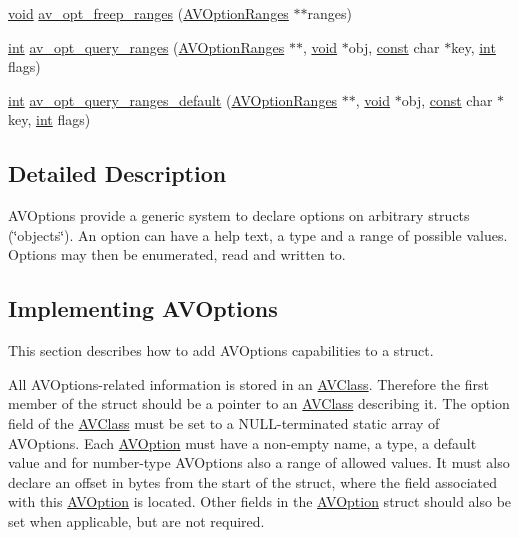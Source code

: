 \begin{DoxyCompactItemize}
\item 
\hyperlink{sound_8c_ae35f5844602719cf66324f4de2a658b3}{void} \hyperlink{group__avoptions_ga880756f24644ff66c806ed2d9ab3d790}{av\+\_\+opt\+\_\+freep\+\_\+ranges} (\hyperlink{struct_a_v_option_ranges}{A\+V\+Option\+Ranges} $\ast$$\ast$ranges)
\item 
\hyperlink{xmltok_8h_a5a0d4a5641ce434f1d23533f2b2e6653}{int} \hyperlink{group__avoptions_ga9751db4da3e0facd522f5b345f4001ef}{av\+\_\+opt\+\_\+query\+\_\+ranges} (\hyperlink{struct_a_v_option_ranges}{A\+V\+Option\+Ranges} $\ast$$\ast$, \hyperlink{sound_8c_ae35f5844602719cf66324f4de2a658b3}{void} $\ast$obj, \hyperlink{getopt1_8c_a2c212835823e3c54a8ab6d95c652660e}{const} char $\ast$key, \hyperlink{xmltok_8h_a5a0d4a5641ce434f1d23533f2b2e6653}{int} flags)
\item 
\hyperlink{xmltok_8h_a5a0d4a5641ce434f1d23533f2b2e6653}{int} \hyperlink{group__avoptions_ga4e50bee09b6a374cc54237314892c001}{av\+\_\+opt\+\_\+query\+\_\+ranges\+\_\+default} (\hyperlink{struct_a_v_option_ranges}{A\+V\+Option\+Ranges} $\ast$$\ast$, \hyperlink{sound_8c_ae35f5844602719cf66324f4de2a658b3}{void} $\ast$obj, \hyperlink{getopt1_8c_a2c212835823e3c54a8ab6d95c652660e}{const} char $\ast$key, \hyperlink{xmltok_8h_a5a0d4a5641ce434f1d23533f2b2e6653}{int} flags)
\end{DoxyCompactItemize}


\subsection{Detailed Description}
A\+V\+Options provide a generic system to declare options on arbitrary structs (\char`\"{}objects\char`\"{}). An option can have a help text, a type and a range of possible values. Options may then be enumerated, read and written to.\hypertarget{group__avoptions_avoptions_implement}{}\subsection{Implementing A\+V\+Options}\label{group__avoptions_avoptions_implement}
This section describes how to add A\+V\+Options capabilities to a struct.

All A\+V\+Options-\/related information is stored in an \hyperlink{struct_a_v_class}{A\+V\+Class}. Therefore the first member of the struct should be a pointer to an \hyperlink{struct_a_v_class}{A\+V\+Class} describing it. The option field of the \hyperlink{struct_a_v_class}{A\+V\+Class} must be set to a N\+U\+L\+L-\/terminated static array of A\+V\+Options. Each \hyperlink{struct_a_v_option}{A\+V\+Option} must have a non-\/empty name, a type, a default value and for number-\/type A\+V\+Options also a range of allowed values. It must also declare an offset in bytes from the start of the struct, where the field associated with this \hyperlink{struct_a_v_option}{A\+V\+Option} is located. Other fields in the \hyperlink{struct_a_v_option}{A\+V\+Option} struct should also be set when applicable, but are not required.

